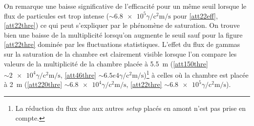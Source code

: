 On remarque une baisse significative de l'efficacité pour un même seuil lorsque le flux de particules est trop intense ($\sim\num{6.8e5}\gamma\si{\per\square\centi\meter\per\second}$ pour \ref{att22eff}, \ref{att22thre}) ce qui peut s'expliquer par le phénomène de saturation. On trouve bien une baisse de la multiplicité lorsqu'on augmente le seuil sauf pour la figure \ref{att22thre} dominée par les fluctuations statistiques. L'effet du flux de gammas sur la saturation de la chambre est clairement visible lorsque l'on compare les valeurs de la multiplicité de la chambre placée à \SI{5.5}{\meter} (\ref{att150thre} $\sim\num{2e4}\gamma\si{\per\square\centi\meter\per\second}$, \ref{att46thre} $\sim{6.5e4}\gamma\si{\per\square\centi\meter\per\second}$)\footnote{La réduction du flux due aux autres \textit{setup} placés en amont n'est pas prise en compte.} à celles où la chambre est placée à \SI{2}{\meter} (\ref{att220thre} $\sim\num{6.8e4}\gamma\si{\per\square\centi\meter\per\second}$, \ref{att22thre} $\sim\num{6.8e5}\gamma\si{\per\square\centi\meter\per\second}$).

\vspace*{-0.2cm}
